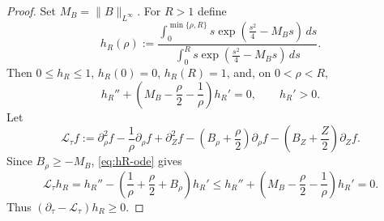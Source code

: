 \documentclass[11pt]{amsart}
\numberwithin{equation}{section}
\theoremstyle{plain}
\theoremstyle{definition}
\theoremstyle{remark}
\begin{document}
\begin{proof}
Set \(M_B=\|B\|_{L^\infty}\).  For \(R>1\) define
\begin{equation}\label{eq:radial-barrier}
   h_R(\rho)
   :=
   \frac{\displaystyle\int_0^{\min\{\rho,R\}} s
      \exp\left(\frac{s^2}{4}-M_Bs\right)\,ds}
   {\displaystyle\int_0^R s
      \exp\left(\frac{s^2}{4}-M_Bs\right)\,ds} .
\end{equation}
Then \(0\le h_R\le1\), \(h_R(0)=0\), \(h_R(R)=1\), and, on
\(0<\rho<R\),
\begin{equation}\label{eq:hR-ode}
   h_R''+\left(M_B-\frac\rho2-\frac1\rho\right)h_R'=0,
   \qquad h_R'>0 .
\end{equation}
Let
\[
   \mathcal L_\tau f
   :=
   \partial_\rho^2f-\frac1\rho\partial_\rho f+\partial_Z^2f
   -\left(B_\rho+\frac\rho2\right)\partial_\rho f
   -\left(B_Z+\frac Z2\right)\partial_Z f .
\]
Since \(B_\rho\ge -M_B\), \eqref{eq:hR-ode} gives
\begin{equation}\label{eq:hR-superharmonic}
   \mathcal L_\tau h_R
   =h_R''-\left(\frac1\rho+\frac\rho2+B_\rho\right)h_R'
   \le
   h_R''+\left(M_B-\frac\rho2-\frac1\rho\right)h_R'
   =0 .
\end{equation}
Thus \((\partial_\tau-\mathcal L_\tau)h_R\ge0\).


\end{proof}
\end{document}
